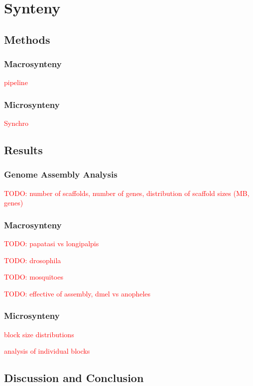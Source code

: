 \section{Synteny}

\subsection{Methods}

\subsubsection{Macrosynteny}
\textcolor{red}{pipeline}

\subsubsection{Microsynteny}
\textcolor{red}{Synchro}

\subsection{Results}

\subsubsection{Genome Assembly Analysis}

\textcolor{red}{TODO: number of scaffolds, number of genes, distribution of scaffold sizes (MB, genes)}

\subsubsection{Macrosynteny}

\textcolor{red}{TODO: papatasi vs longipalpis}

\textcolor{red}{TODO: drosophila}

\textcolor{red}{TODO: mosquitoes}

\textcolor{red}{TODO: effective of assembly, dmel vs anopheles}

\subsubsection{Microsynteny}

\textcolor{red}{block size distributions}

\textcolor{red}{analysis of individual blocks}

\subsection{Discussion and Conclusion}